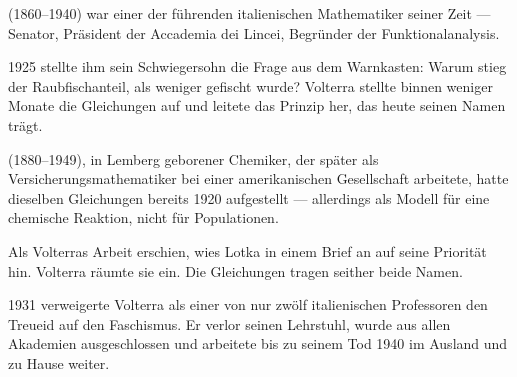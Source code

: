 \begin{geschichte}
 (1860--1940) war einer der führenden italienischen Mathematiker seiner Zeit --- Senator, Präsident der Accademia dei Lincei, Begründer der Funktionalanalysis.

1925 stellte ihm sein Schwiegersohn  die Frage aus dem Warnkasten: Warum stieg der Raubfischanteil, als weniger gefischt wurde? Volterra stellte binnen weniger Monate die Gleichungen auf und leitete das Prinzip her, das heute seinen Namen trägt.

\begin{center}
\begin{minipage}{0.9\textwidth}
\end{minipage}
\end{center}

 (1880--1949), in Lemberg geborener Chemiker, der später als Versicherungsmathematiker bei einer amerikanischen Gesellschaft arbeitete, hatte dieselben Gleichungen bereits 1920 aufgestellt --- allerdings als Modell für eine chemische Reaktion, nicht für Populationen.

Als Volterras Arbeit erschien, wies Lotka in einem Brief an  auf seine Priorität hin. Volterra räumte sie ein. Die Gleichungen tragen seither beide Namen.

1931 verweigerte Volterra als einer von nur zwölf italienischen Professoren den Treueid auf den Faschismus. Er verlor seinen Lehrstuhl, wurde aus allen Akademien ausgeschlossen und arbeitete bis zu seinem Tod 1940 im Ausland und zu Hause weiter.

\begin{center}
\begin{minipage}{0.9\textwidth}
\end{minipage}
\end{center}
\end{geschichte}

